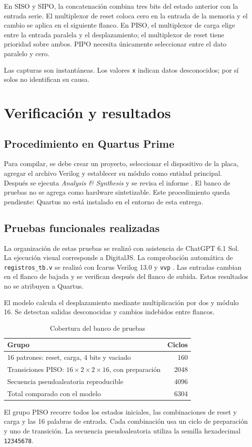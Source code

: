 \documentclass{replab}
\begin{document}
En SISO y SIPO, la concatenación combina tres bits del estado anterior con la entrada serie. El multiplexor de reset coloca cero en la entrada de la memoria y el cambio se aplica en el siguiente flanco. En PISO, el multiplexor de carga elige entre la entrada paralela y el desplazamiento; el multiplexor de reset tiene prioridad sobre ambos. PIPO necesita únicamente seleccionar entre el dato paralelo y cero.

Las capturas son instantáneas. Los valores \texttt{x} indican datos desconocidos; por sí solos no identifican su causa.

\section{Verificación y resultados}
\subsection{Procedimiento en Quartus Prime}
Para compilar, se debe crear un proyecto, seleccionar el dispositivo de la placa, agregar el archivo Verilog y establecer su módulo como entidad principal. Después se ejecuta \textit{Analysis \& Synthesis} y se revisa el informe \cite{quartus}. El banco de pruebas no se agrega como hardware sintetizable. Este procedimiento queda pendiente: Quartus no está instalado en el entorno de esta entrega.

\subsection{Pruebas funcionales realizadas}
La organización de estas pruebas se realizó con asistencia de ChatGPT 6.1 Sol. La ejecución visual corresponde a DigitalJS. La comprobación automática de \texttt{registros\_tb.v} se realizó con Icarus Verilog 13.0 y \texttt{vvp} \cite{icarus}. Las entradas cambian en el flanco de bajada y se verifican después del flanco de subida. Estos resultados no se atribuyen a Quartus.

El modelo calcula el desplazamiento mediante multiplicación por dos y módulo 16. Se detectan salidas desconocidas y cambios indebidos entre flancos.

\begin{table}[H]
\centering\small
\caption{Cobertura del banco de pruebas}
\begin{tabular}{p{}r}
\toprule
Grupo & Ciclos\\\midrule
16 patrones: reset, carga, 4 bits y vaciado & 160\\
Transiciones PISO: $16\times2\times2\times16$, con preparación & 2048\\
Secuencia pseudoaleatoria reproducible & 4096\\\midrule
Total comparado con el modelo & 6304\\\bottomrule
\end{tabular}
\end{table}
El grupo PISO recorre todos los estados iniciales, las combinaciones de reset y carga y las 16 palabras de entrada. Cada combinación usa un ciclo de preparación y uno de transición. La secuencia pseudoaleatoria utiliza la semilla hexadecimal \texttt{12345678}.
\end{document}
